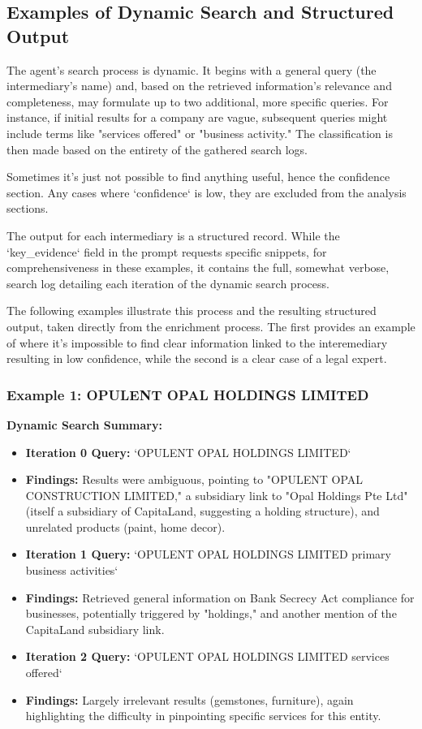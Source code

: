 \subsection*{Examples of Dynamic Search and Structured Output}

The agent's search process is dynamic. It begins with a general query (the intermediary's name) and, based on the retrieved information's relevance and completeness, may formulate up to two additional, more specific queries. For instance, if initial results for a company are vague, subsequent queries might include terms like "services offered" or "business activity." The classification is then made based on the entirety of the gathered search logs.

Sometimes it's just not possible to find anything useful, hence the confidence section. Any cases where `confidence` is low, they are excluded from the analysis sections.

The output for each intermediary is a structured record. While the `key\_evidence` field in the prompt requests specific snippets, for comprehensiveness in these examples, it contains the full, somewhat verbose, search log detailing each iteration of the dynamic search process.

The following examples illustrate this process and the resulting structured output, taken directly from the enrichment process. The first provides an example of where it's impossible to find clear information linked to the interemediary resulting in low confidence, while the second is a clear case of a legal expert.

\subsubsection*{Example 1: OPULENT OPAL HOLDINGS LIMITED}
\textbf{Dynamic Search Summary:}
\begin{itemize}
    \item \textbf{Iteration 0 Query:} `OPULENT OPAL HOLDINGS LIMITED`
    \item \textbf{Findings:} Results were ambiguous, pointing to "OPULENT OPAL CONSTRUCTION LIMITED," a subsidiary link to "Opal Holdings Pte Ltd" (itself a subsidiary of CapitaLand, suggesting a holding structure), and unrelated products (paint, home decor).
    \item \textbf{Iteration 1 Query:} `OPULENT OPAL HOLDINGS LIMITED primary business activities`
    \item \textbf{Findings:} Retrieved general information on Bank Secrecy Act compliance for businesses, potentially triggered by "holdings," and another mention of the CapitaLand subsidiary link.
    \item \textbf{Iteration 2 Query:} `OPULENT OPAL HOLDINGS LIMITED services offered`
    \item \textbf{Findings:} Largely irrelevant results (gemstones, furniture), again highlighting the difficulty in pinpointing specific services for this entity.
\end{itemize}

